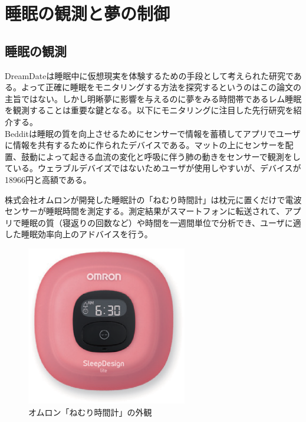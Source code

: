 \section{睡眠の観測と夢の制御}
\subsection{睡眠の観測}
DreamDateは睡眠中に仮想現実を体験するための手段として考えられた研究である。よって正確に睡眠をモニタリングする方法を探究するというのはこの論文の主旨ではない。しかし明晰夢に影響を与えるのに夢をみる時間帯であるレム睡眠を観測することは重要な鍵となる。以下にモニタリングに注目した先行研究を紹介する。\\
Bedditは睡眠の質を向上させるためにセンサーで情報を蓄積してアプリでユーザに情報を共有するために作られたデバイスである。マットの上にセンサーを配置、鼓動によって起きる血流の変化と呼吸に伴う肺の動きをセンサーで観測をしている。ウェラブルデバイズではないためユーザが使用しやすいが、デバイスが18966円と高額である。

株式会社オムロンが開発した睡眠計の「ねむり時間計」は枕元に置くだけで電波センサーが睡眠時間を測定する\cite{omron}。測定結果がスマートフォンに転送されて、アプリで睡眠の質（寝返りの回数など）や時間を一週間単位で分析でき、ユーザに適した睡眠効率向上のアドバイスを行う。

\begin{figure}[htbp]
\begin{center}
\includegraphics[width=7cm]{eps/omuron.eps}
\caption{オムロン「ねむり時間計」の外観}
\label{omuron}
\end{center}
\end{figure}

